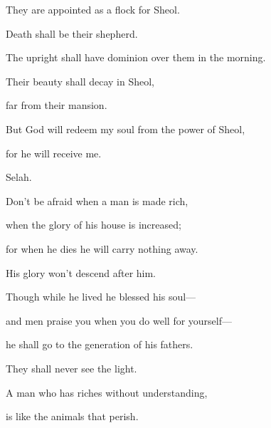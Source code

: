{\Q {}They are appointed as a flock for Sheol.
\par }{\QB Death shall be their shepherd.
\par }{\Q The upright shall have dominion over them in the morning.
\par }{\QB Their beauty shall decay in Sheol,
\par }{\QB far from their mansion.
\par }{\Q {}But God will redeem my soul from the power of Sheol,
\par }{\QB for he will receive me.
\par }{\QS Selah.\par }
{\Q {}Don’t be afraid when a man is made rich,
\par }{\QB when the glory of his house is increased;
\par }{\Q {}for when he dies he will carry nothing away.
\par }{\QB His glory won’t descend after him.
\par }{\Q {}Though while he lived he blessed his soul—
\par }{\QB and men praise you when you do well for yourself—
\par }{\QB {}he shall go to the generation of his fathers.
\par }{\QB They shall never see the light.
\par }{\Q {}A man who has riches without understanding,
\par }{\QB is like the animals that perish.

\par }
